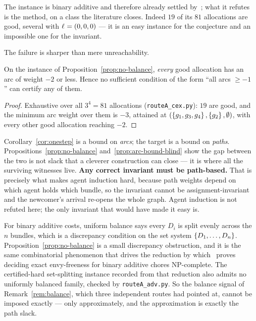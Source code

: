 The instance is binary additive and therefore already settled
by~\cite{LMS26}; what it refutes is the method, on a class the literature
closes. Indeed $19$ of its $81$ allocations are good, several with
$\ell_{} = (0,0,0)$ --- it is an easy instance for the conjecture and an
impossible one for the invariant.

The failure is sharper than mere unreachability.

\begin{proposition}
\label{prop:arc-bound-blind}
On the instance of Proposition~\ref{prop:no-balance}, \emph{every} good
allocation has an arc of weight $-2$ or less. Hence no sufficient condition of
the form ``all arcs $\ge -1$'' can certify any of them.
\end{proposition}

\begin{proof}
Exhaustive over all $3^4 = 81$ allocations (\texttt{routeA\_cex.py}): $19$ are
good, and the minimum arc weight over them is $-3$, attained at
$(\left\{g_1,g_3,g_4\right\},\left\{g_2\right\},\emptyset)$, with every other good allocation
reaching $-2$.
\end{proof}

\begin{remark}
\label{rem:arc-vs-path}
Corollary~\ref{cor:onestep} is a bound on \emph{arcs}; the target is a bound on
\emph{paths}. Propositions~\ref{prop:no-balance} and~\ref{prop:arc-bound-blind}
show the gap between the two is not slack that a cleverer construction can close
--- it is where all the surviving witnesses live. \textbf{Any correct invariant
must be path-based.} That is precisely what makes agent induction hard, because
path weights depend on which agent holds which bundle, so the invariant cannot
be assignment-invariant and the newcomer's arrival re-opens the whole graph.
Agent induction is not refuted here; the only invariant that would have made it
easy is.
\end{remark}

\begin{remark}
\label{rem:discrepancy}
For binary additive costs, uniform balance says every $D_i$ is split evenly
across the $n$ bundles, which is a discrepancy condition on the set system
$\left\{D_1,\dots,D_n\right\}$. Proposition~\ref{prop:no-balance} is a small
discrepancy obstruction, and it is the same combinatorial phenomenon that drives
the reduction by which~\cite{BSV21} proves deciding exact envy-freeness for
binary additive chores NP-complete. The certified-hard set-splitting instance
recorded from that reduction also admits no uniformly balanced family, checked
by \texttt{routeA\_adv.py}. So the balance signal of Remark~\ref{rem:balance},
which three independent routes had pointed at, cannot be imposed exactly ---
only approximately, and the approximation is exactly the path slack.
\end{remark}

